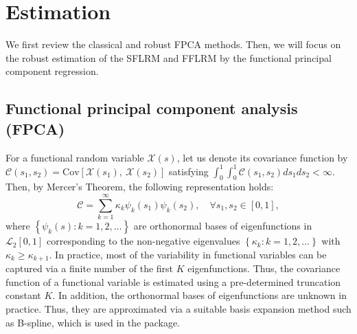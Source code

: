 \section{Estimation}

We first review the classical and robust FPCA methods. Then, we will focus on the robust estimation of the SFLRM and FFLRM by the functional principal component regression.

\subsection*{Functional principal component analysis (FPCA)}

For a functional random variable $\mathcal{X}(s)$, let us denote its covariance function by $\mathcal{C}(s_1, s_2) = \text{Cov}[\mathcal{X}(s_1),~\mathcal{X}(s_2)]$ satisfying $\int_0^1 \int_0^1 \mathcal{C}(s_1, s_2) ds_1 ds_2 < \infty$. Then, by Mercer's Theorem, the following representation holds:
\begin{equation*}
\mathcal{C} = \sum_{k=1}^{\infty} \kappa_k \psi_k(s_1) \psi_k(s_2), \quad \forall s_1, s_2 \in [0,1],
\end{equation*}
where $\left \lbrace \psi_k(s): k = 1, 2, \ldots \right \rbrace$ are orthonormal bases of eigenfunctions in $\mathcal{L}_2[0,1]$ corresponding to the non-negative eigenvalues $\left \lbrace \kappa_k: k = 1, 2, \ldots \right \rbrace$ with $\kappa_k \geq \kappa_{k+1}$. In practice, most of the variability in functional variables can be captured via a finite number of the first $K$ eigenfunctions. Thus, the covariance function of a functional variable is estimated using a pre-determined truncation constant $K$. In addition, the orthonormal bases of eigenfunctions are unknown in practice. Thus, they are approximated via a suitable basis expansion method such as B-spline, which is used in the  package.

